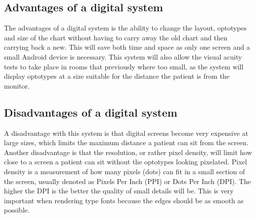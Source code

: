 \documentclass[12pt,a4paper,notitlepage]{report}
\begin{document}
\subsection{Advantages of a digital system}
The advantages of a digital system is the ability to change the layout, optotypes and size of the chart without having to carry away the old chart and then carrying back a new. This will save both time and space as only one screen and a small Android device is necessary. This system will also allow the visual acuity tests to take place in rooms that previously where too small, as the system will display optotypes at a size suitable for the distance the patient is from the monitor.

\subsection{Disadvantages of a digital system}
A disadvantage with this system is that digital screens become very expensive at large sizes, which limits the maximum distance a patient can sit from the screen. Another disadvantage is that the resolution, or rather pixel density, will limit how close to a screen a patient can sit without the optotypes looking pixelated. Pixel density is a measurement of how many pixels (dots) can fit in a small section of the screen, usually denoted as Pixels Per Inch (PPI) or Dots Per Inch (DPI). The higher the DPI is the better the quality of small details will be. This is very important when rendering type fonts because the edges should be as smooth as possible.




\end{document}
